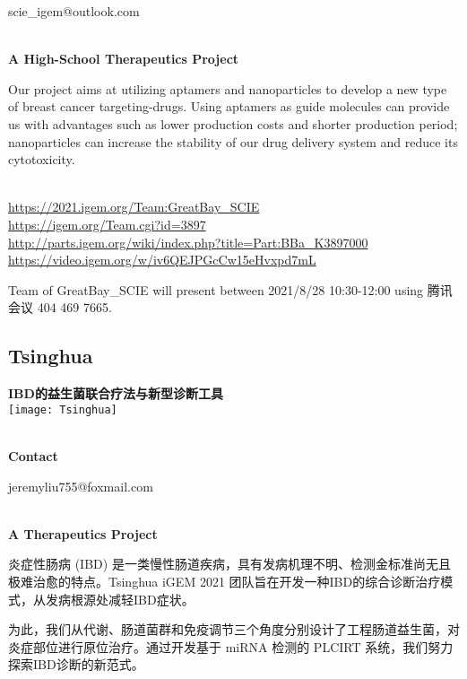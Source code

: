  scie\_igem@outlook.com


\textbf{\\A High-School Therapeutics Project\\}\begin{spacing}{1.5}

Our project aims at utilizing aptamers and nanoparticles to develop a new type of breast cancer targeting-drugs. Using aptamers as guide molecules can provide us with advantages such as lower production costs and shorter production period; nanoparticles can increase the stability of our drug delivery system and reduce its cytotoxicity.\end{spacing}
\\

\url{https://2021.igem.org/Team:GreatBay\_SCIE }\\
\url{https://igem.org/Team.cgi?id=3897 }\\
\url{http://parts.igem.org/wiki/index.php?title=Part:BBa_K3897000 }\\
\url{https://video.igem.org/w/iv6QEJPGcCw15eHvxpd7mL }\\

\vfill{}









Team of GreatBay\_SCIE will present between     2021/8/28 10:30-12:00    using 腾讯会议 404 469 7665.
\newpage


\subsection{\textcolor{Blu}{ Tsinghua } }
\vspace{5mm}
\begin{center}
\large{
  \textbf{ IBD的益生菌联合疗法与新型诊断工具 }\\

  \texttt{[image: Tsinghua]}
}
\end{center}
\textbf{\\Contact}

  jeremyliu755@foxmail.com


\textbf{\\A Therapeutics Project\\}\begin{spacing}{1.5}

炎症性肠病 (IBD) 是一类慢性肠道疾病，具有发病机理不明、检测金标准尚无且极难治愈的特点。Tsinghua iGEM 2021 团队旨在开发一种IBD的综合诊断治疗模式，从发病根源处减轻IBD症状。

为此，我们从代谢、肠道菌群和免疫调节三个角度分别设计了工程肠道益生菌，对炎症部位进行原位治疗。通过开发基于 miRNA 检测的 PLCIRT 系统，我们努力探索IBD诊断的新范式。\end{spacing}
\\

